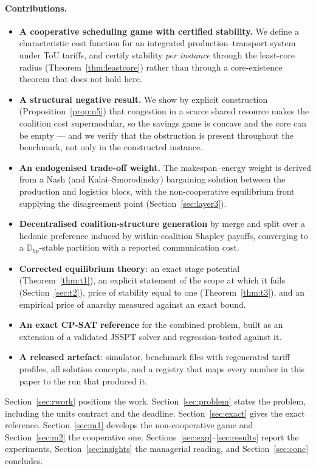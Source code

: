 \documentclass[preprint, 3p, review, 12pt]{elsarticle}
\theoremstyle{definition}
\begin{document}
\paragraph{Contributions.}
\begin{itemize}
  \item \textbf{A cooperative scheduling game with certified stability.} We define a
  characteristic cost function for an integrated production--transport system under ToU
  tariffs, and certify stability \emph{per instance} through the least-core radius
  (Theorem~\ref{thm:leastcore}) rather than through a core-existence theorem that does not
  hold here.
  \item \textbf{A structural negative result.} We show by explicit construction
  (Proposition~\ref{prop:n5}) that congestion in a scarce shared resource makes the
  coalition cost supermodular, so the savings game is concave and the core can be empty ---
  and we verify that the obstruction is present throughout the benchmark, not only in the
  constructed instance.
  \item \textbf{An endogenised trade-off weight.} The makespan--energy weight is derived
  from a Nash (and Kalai--Smorodinsky) bargaining solution between the production and
  logistics blocs, with the non-cooperative equilibrium front supplying the disagreement
  point (Section~\ref{sec:layer3}).
  \item \textbf{Decentralised coalition-structure generation} by merge and split over a
  hedonic preference induced by within-coalition Shapley payoffs, converging to a
  $\mathbb{D}_{hp}$-stable partition with a reported communication cost.
  \item \textbf{Corrected equilibrium theory}: an exact stage potential
  (Theorem~\ref{thm:t1}), an explicit statement of the scope at which it fails
  (Section~\ref{sec:t2}), price of stability equal to one (Theorem~\ref{thm:t3}), and an
  empirical price of anarchy measured against an exact bound.
  \item \textbf{An exact CP-SAT reference} for the combined problem, built as an extension
  of a validated JSSPT solver and regression-tested against it.
  \item \textbf{A released artefact}: simulator, benchmark files with regenerated tariff
  profiles, all solution concepts, and a registry that maps every number in this paper to
  the run that produced it.
\end{itemize}

Section~\ref{sec:rwork} positions the work. Section~\ref{sec:problem} states the problem,
including the units contract and the deadline. Section~\ref{sec:exact} gives the exact
reference. Section~\ref{sec:m1} develops the non-cooperative game and
Section~\ref{sec:m2} the cooperative one. Sections~\ref{sec:exp}--\ref{sec:results} report
the experiments, Section~\ref{sec:insights} the managerial reading, and
Section~\ref{sec:conc} concludes.
\end{document}
